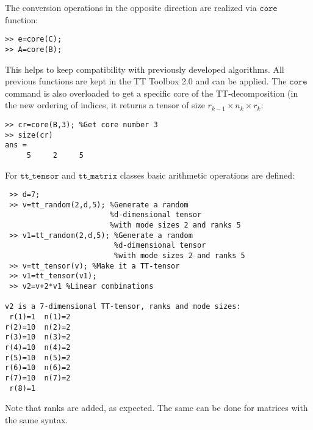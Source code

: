 \documentclass[a4paper,12pt,twoside]{article}
\def\tt{\texttt{tt\_tensor}}
\def\ttm{\texttt{tt\_matrix}}
\begin{document}
The conversion operations in the opposite direction are realized via $\texttt{core}$ function:
\begin{lstlisting}
>> e=core(C); 
>> A=core(B);
\end{lstlisting}
This helps to keep compatibility with previously developed algorithms. All previous functions
are kept in the TT Toolbox 2.0 and can be applied. The $\texttt{core}$ command is also overloaded
to get a specific core of the TT-decomposition (in the new ordering of indices, it returns a tensor of
size $r_{k-1} \times n_k \times r_k$:
\begin{lstlisting}
>> cr=core(B,3); %Get core number 3
>> size(cr)
ans =
     5     2     5
\end{lstlisting} 

For $\tt$ and $\ttm$ classes basic arithmetic operations are defined:
\begin{lstlisting}
 >> d=7;
 >> v=tt_random(2,d,5); %Generate a random 
                        %d-dimensional tensor 
                        %with mode sizes 2 and ranks 5
 >> v1=tt_random(2,d,5); %Generate a random 
                         %d-dimensional tensor 
                         %with mode sizes 2 and ranks 5
 >> v=tt_tensor(v); %Make it a TT-tensor
 >> v1=tt_tensor(v1); 
 >> v2=v+2*v1 %Linear combinations
 
v2 is a 7-dimensional TT-tensor, ranks and mode sizes: 
 r(1)=1  n(1)=2
r(2)=10  n(2)=2
r(3)=10  n(3)=2
r(4)=10  n(4)=2
r(5)=10  n(5)=2
r(6)=10  n(6)=2
r(7)=10  n(7)=2
 r(8)=1        
\end{lstlisting}
Note that ranks are added, as expected. The same can be done for matrices with the same syntax.
\end{document}
